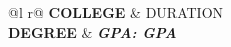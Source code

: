\begin{tabularx}{\linewidth}{ @{}l r@{} }
\color[HTML]{1C033C} \textbf{{{COLLEGE}}} & \hfill  {{DURATION}} \\
\textbf{{{DEGREE}}} & \hfill \textit{\textbf{GPA: {{GPA}}}} \\
\end{tabularx}